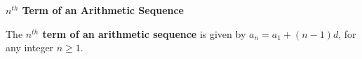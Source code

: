 {\bf $n^{th}$ Term of an Arithmetic Sequence}
\vskip 6pt

The {\bf $n^{th}$ term of an arithmetic sequence} is given by $a_n=a_1+(n-1)d$, for any integer $n\geq 1$.

\vfill\eject
